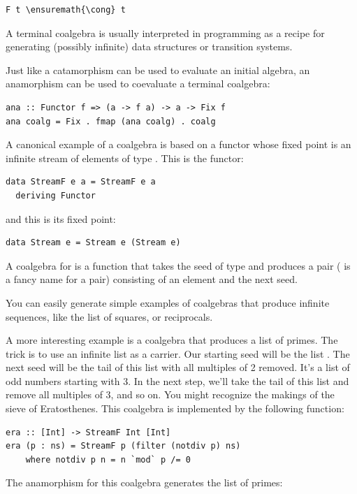 \begin{Verbatim}[commandchars=\\\{\}]
F t \ensuremath{\cong} t
\end{Verbatim}
A terminal coalgebra is usually interpreted in programming as a recipe
for generating (possibly infinite) data structures or transition
systems.

Just like a catamorphism can be used to evaluate an initial algebra, an
anamorphism can be used to coevaluate a terminal coalgebra:

\begin{Verbatim}[commandchars=\\\{\}]
ana :: Functor f => (a -> f a) -> a -> Fix f
ana coalg = Fix . fmap (ana coalg) . coalg
\end{Verbatim}
A canonical example of a coalgebra is based on a functor whose fixed
point is an infinite stream of elements of type . This is the
functor:

\begin{Verbatim}[commandchars=\\\{\}]
data StreamF e a = StreamF e a
  deriving Functor
\end{Verbatim}
and this is its fixed point:

\begin{Verbatim}[commandchars=\\\{\}]
data Stream e = Stream e (Stream e)
\end{Verbatim}
A coalgebra for  is a function that takes the seed of
type  and produces a pair ( is a fancy name
for a pair) consisting of an element and the next seed.

You can easily generate simple examples of coalgebras that produce
infinite sequences, like the list of squares, or reciprocals.

A more interesting example is a coalgebra that produces a list of
primes. The trick is to use an infinite list as a carrier. Our starting
seed will be the list \code{{[}2..{]}}. The next seed will be the tail
of this list with all multiples of 2 removed. It's a list of odd numbers
starting with 3. In the next step, we'll take the tail of this list and
remove all multiples of 3, and so on. You might recognize the makings of
the sieve of Eratosthenes. This coalgebra is implemented by the
following function:

\begin{Verbatim}[commandchars=\\\{\}]
era :: [Int] -> StreamF Int [Int]
era (p : ns) = StreamF p (filter (notdiv p) ns)
    where notdiv p n = n `mod` p /= 0
\end{Verbatim}
The anamorphism for this coalgebra generates the list of primes:


